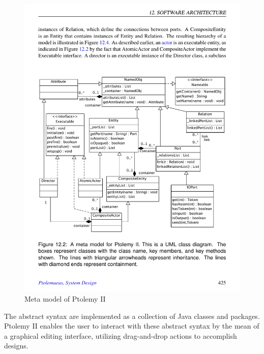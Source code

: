 \begin{figure}[hbt!]
  \centering
  \includegraphics[scale=0.8]{figures/pt2meta.pdf}
  \caption{Meta model of Ptolemy II}
  \label{fig:pt2meta}
\end{figure}

The abstract syntax are implemented as a collection of Java classes and packages. Ptolemy II enables the user to interact with these abstract syntax by the mean of a graphical editing interface, utilizing drag-and-drop actions to accomplish designs.


